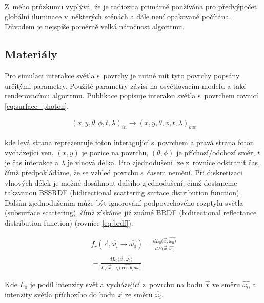 Z~mého průzkumu vyplývá, že je radiozita primárně používána pro předvýpočet globální iluminace v~některých scénách a dále není opakovaně počítána. Důvodem je nejspíše poměrně velká náročnost algoritmu.

\subsection{Materiály}
Pro simulaci interakce světla s~povrchy je nutné mít tyto povrchy popsány určitými parametry. Použité parametry závisí na osvětlovacím modelu a také renderovacímu algoritmu. Publikace \cite{materials} popisuje interakci světla s~povrchem rovnicí \ref{eq:surface_photon}.

\begin{equation} \label{eq:surface_photon}
	\begin{gathered}
		(x, y, \theta, \phi, t, \lambda)_{in} \xrightarrow{} (x, y, \theta, \phi, t, \lambda)_{out}
	\end{gathered}
\end{equation}

kde levá strana reprezentuje foton interagující s~povrchem a pravá strana foton vycházející ven, $(x, y)$ je pozice na povrchu, $(\theta, \phi)$ je příchozí/odchozí směr, $t$ je čas interakce a $\lambda$ je vlnová délka. Pro zjednodušení lze z~rovnice odstranit čas, čímž předpokládáme, že se vzhled povrchu s~časem nemění. Při diskretizaci vlnových délek je možné dosáhnout dalšího zjednodušení, čímž dostaneme takzvanou BSSRDF (bidirectional scattering surface distribution function). Dalším zjednodušením může být ignorování podpovrchového rozptylu světla (subsurface scattering), čímž získáme již známé BRDF (bidirectional reflectance distribution function) (rovnice \ref{eq:brdf}).

\begin{equation} \label{eq:brdf}
	\begin{gathered}
		f_r(\vec{c}, \hat{\omega_i} \xrightarrow{} \hat{\omega_0}) = \frac{dL_0(\vec{x}, \hat{\omega_0)}}{dE(\vec{x}, \hat{\omega_i}} \\
		= \frac{dL_0(\vec{x}, \hat{\omega_0)}}{L_i(\vec{x}, \hat{\omega_i)\cos \theta_i d\omega_i}}
	\end{gathered}
\end{equation}

Kde $L_0$ je podíl intenzity světla vycházející z~povrchu na bodu $\vec{x}$ ve směru $\hat{\omega_0}$ a intenzity světla příchozího do bodu $\vec{x}$ ze směru $\hat{\omega_i}$.

